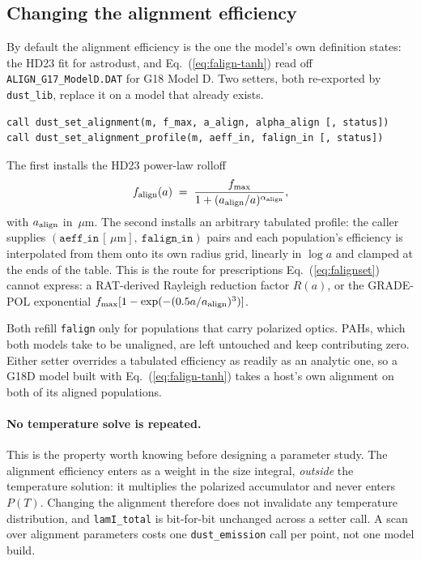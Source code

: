 \documentclass{my_memo}
\newcommand{\code}[1]{\texttt{#1}}
\newcommand{\um}{\ensuremath{\,\mu\mathrm{m}}}
\begin{document}
\subsection{Changing the alignment efficiency}\label{sec:pol:align}

By default the alignment efficiency is the one the model's own definition
states: the HD23 fit for astrodust, and Eq.~(\ref{eq:falign-tanh}) read off
\code{ALIGN\_G17\_ModelD.DAT} for G18 Model D. Two setters, both re-exported by
\code{dust\_lib}, replace it on a model that already exists.

\begin{lstlisting}
call dust_set_alignment(m, f_max, a_align, alpha_align [, status])
call dust_set_alignment_profile(m, aeff_in, falign_in [, status])
\end{lstlisting}

The first installs the HD23 power-law rolloff
\begin{equation}
f_{\rm align}(a) \;=\; \frac{f_{\max}}{1 + (a_{\rm align}/a)^{\alpha_{\rm align}}},
\label{eq:falignset}
\end{equation}
with $a_{\rm align}$ in \um. The second installs an arbitrary tabulated
profile: the caller supplies $(\code{aeff\_in}\,[\um],\ \code{falign\_in})$
pairs and each population's efficiency is interpolated from them onto its own
radius grid, linearly in $\log a$ and clamped at the ends of the table. This
is the route for prescriptions Eq.~(\ref{eq:falignset}) cannot express: a
RAT-derived Rayleigh reduction factor $R(a)$, or the GRADE-POL exponential
$f_{\max}[1 - \exp(-(0.5a/a_{\rm align})^3)]$.

Both refill \code{falign} only for populations that carry polarized optics.
PAHs, which both models take to be unaligned, are left untouched and keep
contributing zero. Either setter overrides a tabulated efficiency as readily as
an analytic one, so a G18D model built with Eq.~(\ref{eq:falign-tanh}) takes a
host's own alignment on both of its aligned populations.

\paragraph{No temperature solve is repeated.} This is the property worth
knowing before designing a parameter study. The alignment efficiency enters as
a weight in the size integral, \emph{outside} the temperature solution: it
multiplies the polarized accumulator and never enters $P(T)$. Changing the
alignment therefore does not invalidate any temperature distribution, and
\code{lamI\_total} is bit-for-bit unchanged across a setter call. A scan over
alignment parameters costs one \code{dust\_emission} call per point, not one
model build.
\end{document}
